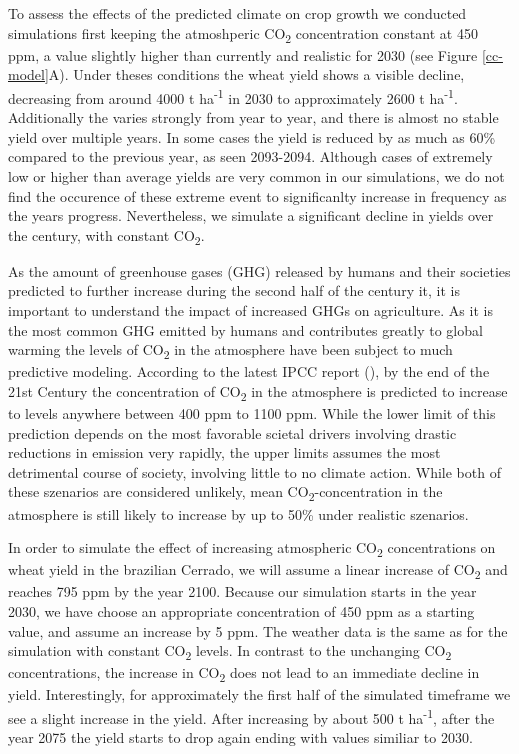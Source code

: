 \documentclass[11pt]{article}
\begin{document}
To assess the effects of the predicted climate on crop growth we conducted simulations first keeping the atmoshperic CO\textsubscript{2} concentration constant at 450 ppm, a value slightly higher than currently and realistic for 2030 (see Figure \ref{cc-model}A). Under theses conditions the wheat yield shows a visible decline, decreasing from around 4000 t ha\textsuperscript{-1} in 2030 to approximately 2600 t ha\textsuperscript{-1}. Additionally the varies strongly from year to year, and there is almost no stable yield over multiple years. In some cases the yield is reduced by as much as 60\% compared to the previous year, as seen 2093-2094. Although cases of extremely low or higher than average yields are very common in our simulations, we do not find the occurence of these extreme event to significanlty increase in frequency as the years progress. Nevertheless, we simulate a significant decline in yields over the century, with constant CO\textsubscript{2}.

As the amount of greenhouse gases (GHG) released by humans and their societies predicted to further increase during the second half of the century it, it is important to understand the impact of increased GHGs on agriculture. As it is the most common GHG emitted by humans and contributes greatly to global warming the levels of CO\textsubscript{2} in the atmosphere have been subject to much predictive modeling. According to the latest IPCC report (\cite{poertner-2022-climat-chang}), by the end of the 21st Century the concentration of CO\textsubscript{2} in the atmosphere is predicted to increase to levels anywhere between 400 ppm to 1100 ppm. While the lower limit of this prediction depends on the most favorable scietal drivers involving drastic reductions in emission very rapidly, the upper limits assumes the most detrimental course of society, involving little to no climate action. While both of these szenarios are considered unlikely, mean CO\textsubscript{2}-concentration in the atmosphere is still likely to increase by up to 50\% under realistic szenarios.

In order to simulate the effect of increasing atmospheric CO\textsubscript{2} concentrations on wheat yield in the brazilian Cerrado, we will assume a linear increase of CO\textsubscript{2} and reaches 795 ppm by the year 2100. Because our simulation starts in the year 2030, we have choose an appropriate concentration of 450 ppm as a starting value, and assume an increase by 5 ppm. The weather data is the same as for the simulation with constant CO\textsubscript{2} levels.
In contrast to the unchanging CO\textsubscript{2} concentrations, the increase in CO\textsubscript{2} does not lead to an immediate decline in yield. Interestingly, for approximately the first half of the simulated timeframe we see a slight increase in the yield. After increasing by about 500 t ha\textsuperscript{-1}, after the year 2075 the yield starts to drop again ending with values similiar to 2030.
\end{document}
